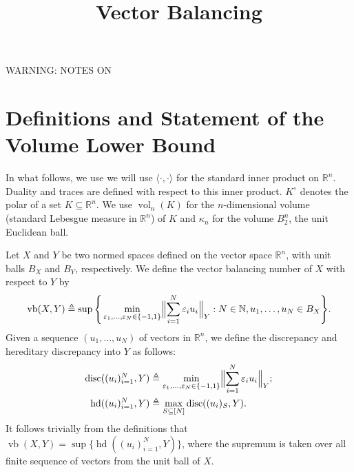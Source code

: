 \documentclass[12pt]{article}
\newcommand{\R}{{\mathbb{R}}}
\newcommand{\T}{\mathsf T}
\newcommand\eps{\varepsilon}
\newcommand{\eqdef}{\triangleq}
\newcommand{\inner}[2]{\langle #1, #2 \rangle}
\DeclareMathOperator{\vollb}{volLB}
\DeclareMathOperator{\disc}{disc}
\DeclareMathOperator{\hd}{hd}
\DeclareMathOperator{\vb}{vb}
\DeclareMathOperator{\vol}{vol}
\DeclareMathOperator{\lspan}{span}
\newcommand{\noteswarning}{{\begin{center} {\Large WARNING: NOTES ON}\end{center}}}
\newcommand{\noteswarning}{{}}
\begin{document}
\title{Vector Balancing}
\maketitle

\noteswarning


\section{Definitions and Statement of the Volume Lower Bound}

In what follows, we use we will use $\inner{\cdot}{\cdot}$
for the standard inner product on $\R^n$. Duality and traces are
defined with respect to this inner product. $K^\circ$ denotes the
polar of a set $K \subseteq \R^n$. We use $\vol_n(K)$ for the
$n$-dimensional volume (standard Lebesgue measure in $\R^n$) of $K$ and
$\kappa_n$ for the volume $B_2^n$, the unit Euclidean ball.

Let $X$ and $Y$ be two normed spaces defined on the vector space
$\R^n$, with unit balls $B_X$ and $B_Y$, respectively. We define
the vector balancing number of $X$ with respect to $Y$ by
\[
\vb(X, Y) \eqdef \sup\Bigg\{ 
\min_{\eps_1, \ldots,\eps_N \in \{-1, 1\}} \Bigl\|\sum_{i = 1}^N{\eps_i u_i}\Bigr\|_{Y}: N \in \mathbb{N},
u_1, \ldots, u_N \in B_X\Bigg\}.
\]
Given a sequence $(u_1, \ldots, u_N)$ of vectors in $\R^n$, we define the
discrepancy and hereditary discrepancy into $Y$ as follows:
\begin{align*}
\disc((u_i)_{i = 1}^N,Y) &\eqdef \min_{\eps_1, \ldots,\eps_N \in
  \{-1, 1\}}
\Bigl\|\sum_{i = 1}^N{\eps_i u_i}\Bigr\|_{Y};\\
\hd((u_i)_{i = 1}^N, Y) &\eqdef \max_{S \subseteq  [N]}{\disc((u_i)_S, Y)}.
\end{align*}
It follows trivially from the definitions that $\vb(X, Y) =
\sup\{\hd((u_i)_{i = 1}^N, Y)\}$, where the supremum is taken over all
finite sequence of vectors from the unit ball of $X$.

\end{document}
